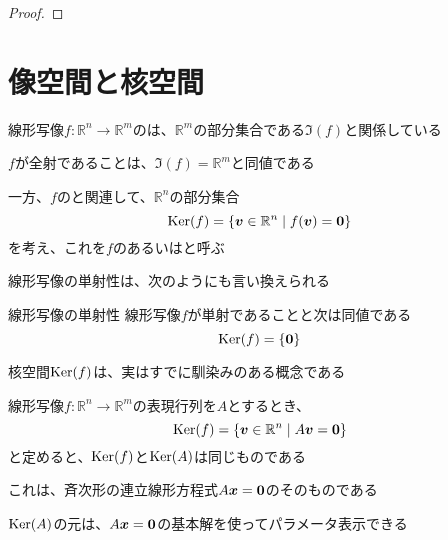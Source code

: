 \documentclass[../../../topic_linear-algebra]{subfiles}
\begin{document}
\begin{proof}
\end{proof}

\sectionline
\section{像空間と核空間}

線形写像$f\colon \mathbb{R}^n \to \mathbb{R}^m$のは、$\mathbb{R}^m$の部分集合である$\Im(f)$と関係している

$f$が全射であることは、$\Im(f) = \mathbb{R}^m$と同値である

\sectionline

一方、$f$のと関連して、$\mathbb{R}^n$の部分集合
\begin{equation*}
  \operatorname{Ker}(f) = \{ \vb*{v} \in \mathbb{R}^n \mid f(\vb*{v}) = \vb*{0} \}
\end{equation*}
を考え、これを$f$のあるいはと呼ぶ

\br

線形写像の単射性は、次のようにも言い換えられる

\begin{theorem}{線形写像の単射性}
  線形写像$f$が単射であることと次は同値である
  \begin{equation*}
    \operatorname{Ker}(f) = \{ \vb*{0} \}
  \end{equation*}
\end{theorem}

\sectionline

核空間$\operatorname{Ker}(f)$は、実はすでに馴染みのある概念である

\br

線形写像$f\colon \mathbb{R}^n \to \mathbb{R}^m$の表現行列を$A$とするとき、
\begin{equation*}
  \operatorname{Ker}(f) = \{ \vb*{v} \in \mathbb{R}^n \mid A\vb*{v} = \vb*{0} \}
\end{equation*}
と定めると、$\operatorname{Ker}(f)$と$\operatorname{Ker}(A)$は同じものである

これは、斉次形の連立線形方程式$A\vb*{x} = \vb*{0}$のそのものである

\br

$\operatorname{Ker}(A)$の元は、$A\vb*{x} = \vb*{0}$の基本解を使ってパラメータ表示できる
\end{document}
